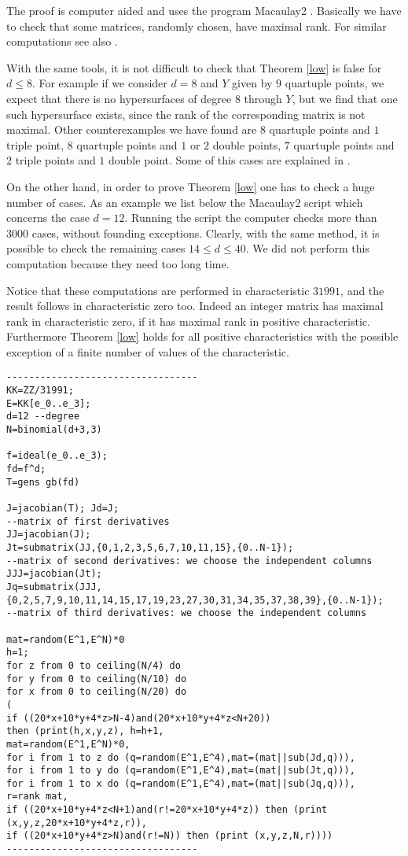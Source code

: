 \documentclass{amsart}
\theoremstyle{plain}
\theoremstyle{definition}
\begin{document}
The proof is computer aided and uses the program Macaulay2 \cite{GS}.
Basically we have to check that some matrices, randomly chosen, have
maximal rank. For similar computations see also \cite{partpolint}.

With the same tools, it is not difficult to check that Theorem
\ref{low} is false for $d\le 8$.
For example if we consider  $d=8$ and
$Y$ given by $9$ quartuple points, we expect that there is no
hypersurfaces of degree $8$ through $Y$, but we find that one such
hypersurface exists, since the rank of the corresponding matrix is not
maximal.
Other counterexamples we have found are $8$ quartuple points and $1$
triple point,
$8$ quartuple points and $1$ or $2$ double points, $7$ quartuple
points and $2$ triple points and $1$ double point.
Some of this cases are explained in \cite[Example
7.7]{laface-ugaglia}.

On the other hand, in order to prove Theorem \ref{low} one has to
check a huge number of cases. As an example we list below the
Macaulay2 script which concerns the case $d=12$. Running the
script the computer checks more than 3000 cases, without founding
exceptions. Clearly, with the same method, it is possible to check
the remaining cases $14\le d\le40$. We did not perform this
computation because they need too long time.

Notice that these computations are performed in  characteristic
$31991$, and the result follows in characteristic zero too.
Indeed an integer matrix has maximal rank in
characteristic zero,
if it has maximal rank in positive characteristic.
Furthermore Theorem \ref{low} holds for all positive characteristics with the possible
exception of a finite number of values of the characteristic.

\begin{footnotesize}
\begin{verbatim}
----------------------------------
KK=ZZ/31991;
E=KK[e_0..e_3];
d=12 --degree
N=binomial(d+3,3)

f=ideal(e_0..e_3);
fd=f^d;
T=gens gb(fd)

J=jacobian(T); Jd=J;
--matrix of first derivatives
JJ=jacobian(J);
Jt=submatrix(JJ,{0,1,2,3,5,6,7,10,11,15},{0..N-1});
--matrix of second derivatives: we choose the independent columns
JJJ=jacobian(Jt);
Jq=submatrix(JJJ,{0,2,5,7,9,10,11,14,15,17,19,23,27,30,31,34,35,37,38,39},{0..N-1});
--matrix of third derivatives: we choose the independent columns

mat=random(E^1,E^N)*0
h=1;
for z from 0 to ceiling(N/4) do
for y from 0 to ceiling(N/10) do
for x from 0 to ceiling(N/20) do
(
if ((20*x+10*y+4*z>N-4)and(20*x+10*y+4*z<N+20))
then (print(h,x,y,z), h=h+1,
mat=random(E^1,E^N)*0,
for i from 1 to z do (q=random(E^1,E^4),mat=(mat||sub(Jd,q))),
for i from 1 to y do (q=random(E^1,E^4),mat=(mat||sub(Jt,q))),
for i from 1 to x do (q=random(E^1,E^4),mat=(mat||sub(Jq,q))),
r=rank mat,
if ((20*x+10*y+4*z<N+1)and(r!=20*x+10*y+4*z)) then (print (x,y,z,20*x+10*y+4*z,r)),
if ((20*x+10*y+4*z>N)and(r!=N)) then (print (x,y,z,N,r))))
----------------------------------
\end{verbatim}
\end{footnotesize}
\end{document}
